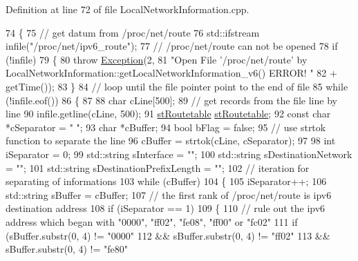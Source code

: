 Definition at line 72 of file Local\-Network\-Information.\-cpp.


\begin{DoxyCode}
74 \{
75     \textcolor{comment}{// get datum from /proc/net/route}
76     std::ifstream infile(\textcolor{stringliteral}{"/proc/net/ipv6\_route"});
77     \textcolor{comment}{// /proc/net/route can not be opened}
78     \textcolor{keywordflow}{if} (!infile)
79     \{
80         \textcolor{keywordflow}{throw} \hyperlink{classException}{Exception}(2,
81                 \textcolor{stringliteral}{"Open File '/proc/net/route' by LocalNetworkInformation::getLocalNetworkInformation\_v6()
       ERROR! "}
82                         + getTime());
83     \}
84     \textcolor{comment}{// loop until the file pointer point to the end of file}
85     \textcolor{keywordflow}{while} (!infile.eof())
86     \{
87 
88         \textcolor{keywordtype}{char} cLine[500];
89         \textcolor{comment}{// get records from the file line by line}
90         infile.getline(cLine, 500);
91         \hyperlink{structstRoutetable}{stRoutetable} \hyperlink{structstRoutetable}{stRoutetable};
92         \textcolor{keyword}{const} \textcolor{keywordtype}{char} *cSeparator = \textcolor{stringliteral}{"   "};
93         \textcolor{keywordtype}{char} *cBuffer;
94         \textcolor{keywordtype}{bool} bFlag = \textcolor{keyword}{false};
95         \textcolor{comment}{// use strtok function to separate the line}
96         cBuffer = strtok(cLine, cSeparator);
97 
98         \textcolor{keywordtype}{int} iSeparator = 0;
99         std::string sInterface = \textcolor{stringliteral}{""};
100         std::string sDestinationNetwork = \textcolor{stringliteral}{""};
101         std::string sDestinationPrefixLength = \textcolor{stringliteral}{""};
102         \textcolor{comment}{// iteration for separating of informations}
103         \textcolor{keywordflow}{while} (cBuffer)
104         \{
105             iSeparator++;
106             std::string sBuffer = cBuffer;
107             \textcolor{comment}{// the first rank of /proc/net/route is ipv6 destination address}
108             \textcolor{keywordflow}{if} (iSeparator == 1)
109             \{
110                 \textcolor{comment}{// rule out the ipv6 address which began with "0000", "ff02", "fe08", "ff00" or "fc02"}
111                 \textcolor{keywordflow}{if} (sBuffer.substr(0, 4) != \textcolor{stringliteral}{"0000"}
112                         && sBuffer.substr(0, 4) != \textcolor{stringliteral}{"ff02"}
113                         && sBuffer.substr(0, 4) != \textcolor{stringliteral}{"fe80"}

\end{DoxyCode}

